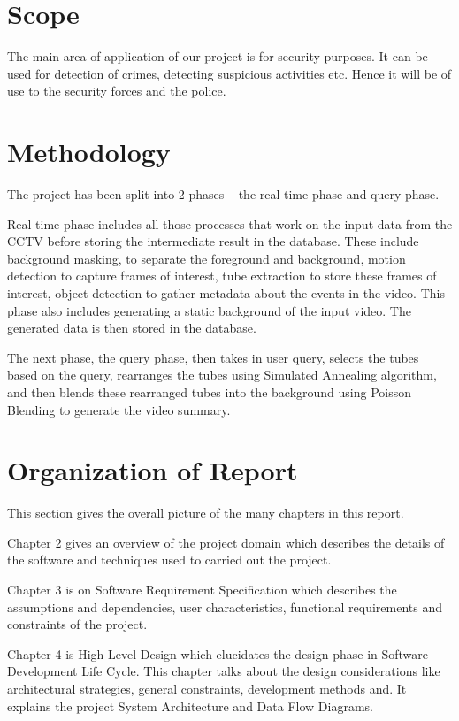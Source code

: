 \section{Scope}

The main area of application of our project is for security purposes. It can be used for detection of crimes, detecting suspicious activities etc. Hence it will be of use to the security forces and the police.

\section{Methodology}

The project has been split into 2 phases – the real-time phase and query phase.

Real-time phase includes all those processes that work on the input data from the CCTV before storing the intermediate result in the database. These include background masking, to separate the foreground and background, motion detection to capture frames of interest, tube extraction to store these frames of interest, object detection to gather metadata about the events in the video. This phase also includes generating a static background of the input video. The generated data is then stored in the database.

The next phase, the query phase, then takes in user query, selects the tubes based on the query, rearranges the tubes using Simulated Annealing algorithm, and then blends these rearranged tubes into the background using Poisson Blending to generate the video summary.


\section{Organization of Report}

This section gives the overall picture of the many chapters in this report.

Chapter 2 gives an overview of the project domain which describes the details of the software and techniques used to carried out the project.

Chapter 3 is on Software Requirement Specification which describes the assumptions and dependencies, user characteristics, functional requirements and constraints of the project.

Chapter 4 is High Level Design which elucidates the design phase in Software Development Life Cycle. This chapter talks about the design considerations like architectural strategies, general constraints, development methods and. It explains the project System Architecture and Data Flow Diagrams.

